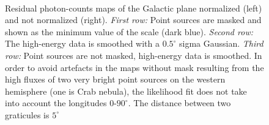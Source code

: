 \documentclass[a4paper]{article}
\begin{document}
\begin{figure}[H]
{\begin{subfigure}[b]{.5\textwidth}
	\end{subfigure}%
	}\\
\caption{Residual photon-counts maps of the Galactic plane normalized (left) and not normalized (right). \textit{First row:} Point sources are masked and shown as the minimum value of the scale (dark blue). \textit{Second row:} The high-energy data is smoothed with a $0.5^\circ$ sigma Gaussian. \textit{Third row:} Point sources are not masked, high-energy data is smoothed. In order to avoid artefacts in the maps without mask resulting from the high fluxes of two very bright point sources on the western hemisphere (one is Crab nebula), the likelihood fit does not take into account the longitudes 0-$90^\circ$. The distance between two graticules is $5^\circ$}
\label{Fit_IC_pi0_to_ROI}
\end{figure}
\end{document}
